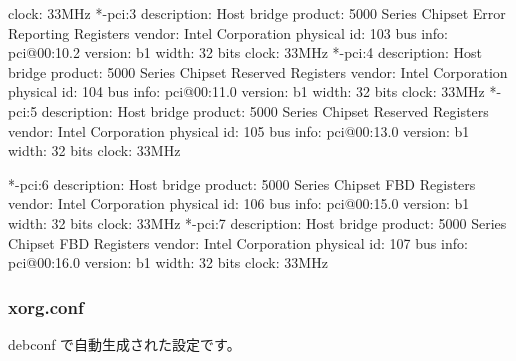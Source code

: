 \documentclass[mingoth,a4paper]{jsarticle}
\begin{document}
\begin{commandline}
          clock: 33MHz
     *-pci:3
          description: Host bridge
          product: 5000 Series Chipset Error Reporting Registers
          vendor: Intel Corporation
          physical id: 103
          bus info: pci@00:10.2
          version: b1
          width: 32 bits
          clock: 33MHz
     *-pci:4
          description: Host bridge
          product: 5000 Series Chipset Reserved Registers
          vendor: Intel Corporation
          physical id: 104
          bus info: pci@00:11.0
          version: b1
          width: 32 bits
          clock: 33MHz
     *-pci:5
          description: Host bridge
          product: 5000 Series Chipset Reserved Registers
          vendor: Intel Corporation
          physical id: 105
          bus info: pci@00:13.0
          version: b1
          width: 32 bits
          clock: 33MHz
\end{commandline}
\begin{commandline}
     *-pci:6
          description: Host bridge
          product: 5000 Series Chipset FBD Registers
          vendor: Intel Corporation
          physical id: 106
          bus info: pci@00:15.0
          version: b1
          width: 32 bits
          clock: 33MHz
     *-pci:7
          description: Host bridge
          product: 5000 Series Chipset FBD Registers
          vendor: Intel Corporation
          physical id: 107
          bus info: pci@00:16.0
          version: b1
          width: 32 bits
          clock: 33MHz
\end{commandline}

\subsubsection{xorg.conf}

debconf で自動生成された設定です。
\end{document}
